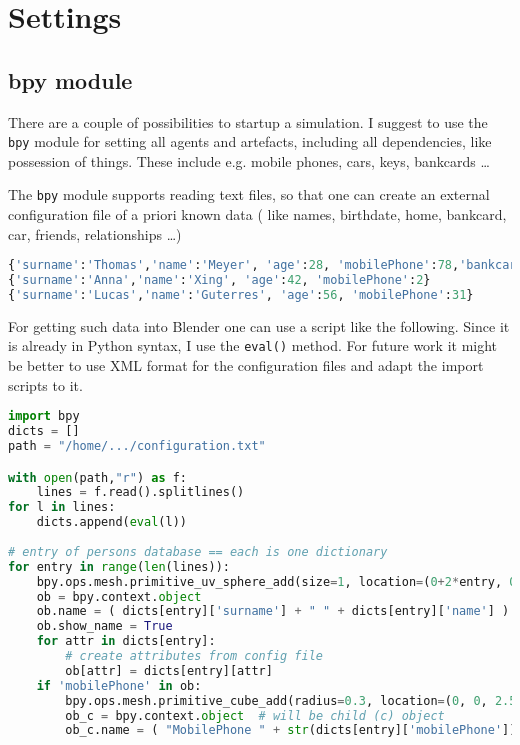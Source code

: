 \documentclass[11pt,a4paper]{article}
\begin{document}
\section{Settings}
\subsection{bpy module}
There are a couple of possibilities to startup a simulation. I suggest to use the \texttt{bpy} module for setting all agents and artefacts, including all dependencies, like possession of things. These include e.g. mobile phones, cars, keys, bankcards \dots

The \texttt{bpy} module supports reading text files, so that one can create an external configuration file of a priori known data ( like names, birthdate, home, bankcard, car, friends, relationships \dots)

\begin{lstlisting}[language = Python, caption={Example config file to set personalities. Here the textfile uses already Python syntax for Python dictionaries.}]
{'surname':'Thomas','name':'Meyer', 'age':28, 'mobilePhone':78,'bankcard':'300112'}
{'surname':'Anna','name':'Xing', 'age':42, 'mobilePhone':2}
{'surname':'Lucas','name':'Guterres', 'age':56, 'mobilePhone':31}
\end{lstlisting}

For getting such data into Blender one can use a script like the following. Since it is already in Python syntax, I use the \texttt{eval()} method. For future work it might be better to use XML format for the configuration files and adapt the import scripts to it.

\begin{lstlisting}[language = Python, caption=Excerpt from \textit{setPersonalities.py} in \textit{setups\_2021\_09\_07.blend}, label=setPersons]
import bpy
dicts = []
path = "/home/.../configuration.txt"

with open(path,"r") as f:
    lines = f.read().splitlines()    
for l in lines: 
    dicts.append(eval(l)) 
    
# entry of persons database == each is one dictionary    
for entry in range(len(lines)):    
    bpy.ops.mesh.primitive_uv_sphere_add(size=1, location=(0+2*entry, 0, 1)) 
    ob = bpy.context.object
    ob.name = ( dicts[entry]['surname'] + " " + dicts[entry]['name'] )
    ob.show_name = True  
    for attr in dicts[entry]:
        # create attributes from config file
        ob[attr] = dicts[entry][attr]   
    if 'mobilePhone' in ob:
        bpy.ops.mesh.primitive_cube_add(radius=0.3, location=(0, 0, 2.5) )
        ob_c = bpy.context.object  # will be child (c) object  
        ob_c.name = ( "MobilePhone " + str(dicts[entry]['mobilePhone']) )        
\end{lstlisting}
\end{document}
